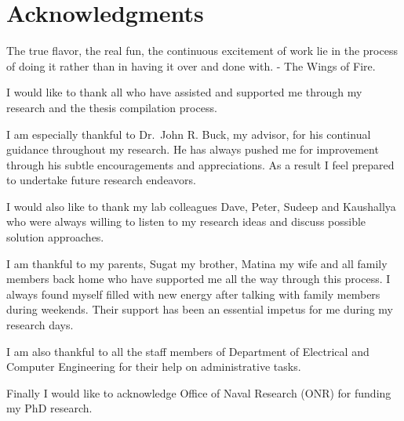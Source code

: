 \chapter*{Acknowledgments}
\onehalfspacing
The true flavor, the real fun, the continuous excitement of work lie in the process of doing it rather than in having it over and done with. - The Wings of Fire.

I would like to thank all who have assisted and supported me through my research and the thesis compilation process.

I am especially thankful to Dr.~John R. Buck, my advisor, for his continual guidance throughout my research. He has always pushed me for improvement through his subtle encouragements and appreciations. As a result I feel prepared to undertake future research endeavors. 

I would also like to thank my lab colleagues Dave, Peter, Sudeep and Kaushallya who were always willing to listen to my research ideas and discuss possible solution approaches.

I am thankful to my parents, Sugat my brother, Matina my wife and all family members back home who have supported me all the way through this process. I always found myself filled with new energy after talking with family members during weekends. Their support has been an essential impetus for me during my research days.

I am also thankful to all the staff members of Department of Electrical and Computer Engineering for their help on administrative tasks.

Finally I would like to acknowledge Office of Naval Research (ONR) for funding my PhD research.

